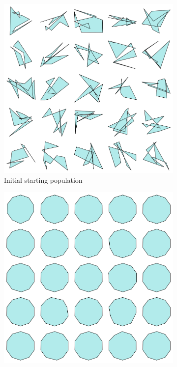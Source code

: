 \documentclass{article}
\begin{document}
\begin{figure}[H]
    \centering
    \begin{subfigure}[b]{0.45\textwidth}
        \centering
        \includegraphics[width=\textwidth]{figures/GAResults/GA2/10point_initial_pop.png}
        \caption{Initial starting population}
        \label{fig:GA2_starting}
    \end{subfigure}
    \hfill
    \begin{subfigure}[b]{0.45\textwidth}
        \centering
        \includegraphics[width=\textwidth]{figures/GAResults/GA2/final_population.png}

\end{subfigure}
\end{figure}
\end{document}
